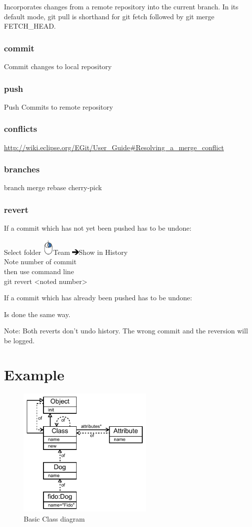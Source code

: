 \documentclass{scrreprt}
\newcommand{\rightMouse}{%
\includegraphics[width=15pt]{img/rightMouse.jpg}}
\newcommand{\rightArrow}{%
\includegraphics[width=10pt]{img/rightArrow.png}\hspace{1mm}}
\newcommand{\layerOne}[1]{\chapter{#1}}
\newcommand{\layerThree}[1]{\subsection{#1}}
\begin{document}
Incorporates changes from a remote repository into the current branch. 
In its default mode, git pull is shorthand for git fetch followed by git merge FETCH_HEAD.

\layerThree{commit}

Commit changes to local repository

\layerThree{push}

Push Commits to remote repository

\layerThree{conflicts}

\url{http://wiki.eclipse.org/EGit/User_Guide#Resolving_a_merge_conflict}

\layerThree{branches}
branch
merge
rebase
cherry-pick

\layerThree{revert}

If a commit which has not yet been pushed has to be undone:

Select folder \rightMouse Team \rightArrow Show in History \\
Note number of commit
\\ then use command line \\
{\ttfamily git revert <noted number>}

\vspace{5mm}
\noindent If a commit which has already been pushed has to be undone:

Is done the same way.

\vspace{5mm}
\noindent Note: Both reverts don't undo history. The wrong commit and the reversion will
be logged.

\layerOne{Example}

\begin{figure}[ht!]
	\centering
	\includegraphics[width=185pt]{img/classDiagram1.pdf}
	\caption{Basic Class diagram}
	\label{fig:exampleDogClassDiagram}
\end{figure} 
\end{document}
